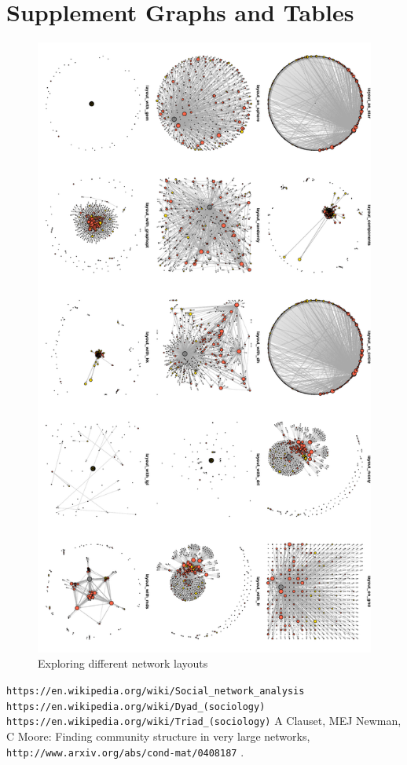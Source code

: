 \documentclass[11pt]{article}
\begin{document}
\section{Supplement Graphs and Tables} \label{App:AppendixB}
\begin{figure}[ht]
\centering
\caption{Exploring different network layouts}
\label{fig:trylayout}
\includegraphics[width=.5\textwidth]{report_explore_layout}
\end{figure}
\clearpage
\begin{thebibliography}{1}
 \verb+https://en.wikipedia.org/wiki/Social_network_analysis+
 \verb+https://en.wikipedia.org/wiki/Dyad_(sociology)+
 \verb+https://en.wikipedia.org/wiki/Triad_(sociology)+
 A Clauset, MEJ Newman, C Moore: Finding community structure in very large networks, \verb+http://www.arxiv.org/abs/cond-mat/0408187+ .
\end{thebibliography}
\end{document}
